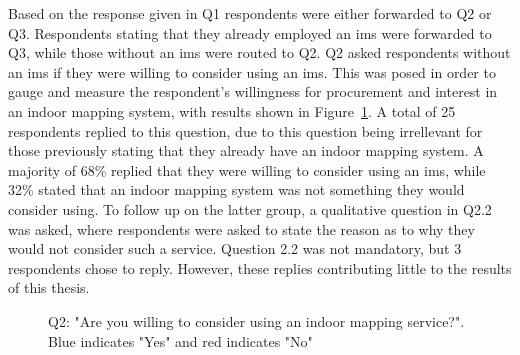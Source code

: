 Based on the response given in Q1 respondents were either forwarded to Q2 or Q3. Respondents stating that they already employed an \gls{ims} were forwarded to Q3, while those without an \gls{ims} were routed to Q2. Q2 asked respondents without an \gls{ims} if they were willing to consider using an \gls{ims}. This was posed in order to gauge and measure the respondent's willingness for procurement and interest in an indoor mapping system, with results shown in Figure~\ref{fig:q2}. A total of 25 respondents replied to this question, due to this question being irrellevant for those previously stating that they already have an indoor mapping system. A majority of 68\% replied that they were willing to consider using an \gls{ims}, while 32\% stated that an indoor mapping system was not something they would consider using. To follow up on the latter group, a qualitative question in Q2.2 was asked, where respondents were asked to state the reason as to why they would not consider such a service. Question 2.2 was not mandatory, but 3 respondents chose to reply. However, these replies contributing little to the results of this thesis.


\begin{figure}[H]
    \centering
    \caption{Q2: "Are you willing to consider using an indoor mapping service?". Blue indicates "Yes" and red indicates "No"}
    \label{fig:q2}
\end{figure}


